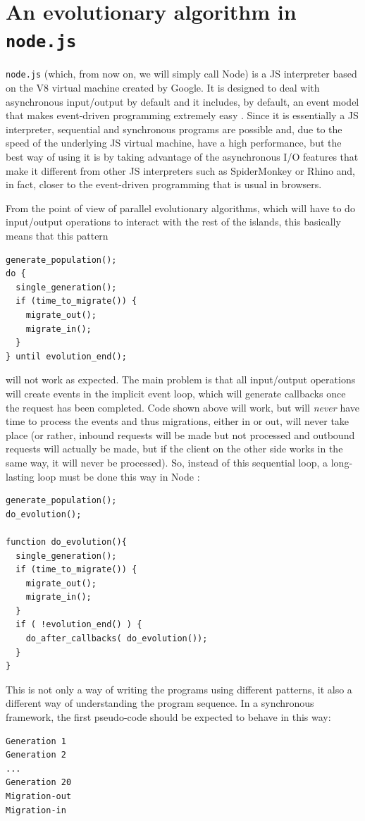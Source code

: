 \documentclass{sig-alternate}
\begin{document}
\section{An evolutionary algorithm in {\tt node.js}}
\label{sec:node}

{\tt node.js} (which, from now on, we will simply call Node) is a JS
interpreter based on the V8 virtual machine created by Google. It is
designed to deal with asynchronous input/output by default and it
includes, by default, an event model that makes event-driven
programming extremely easy \cite{5617064}. Since it is essentially a
JS interpreter, sequential and synchronous programs are possible and,
due to the speed of the underlying JS virtual machine, have a high
performance, but the best way of using it is by taking advantage of
the asynchronous I/O features that make it different from other JS
interpreters such as SpiderMonkey or Rhino and, in fact, closer to the
event-driven programming that is usual in browsers.

From the point of view of parallel evolutionary algorithms, which will
have to do input/output operations to interact with the rest of the
islands, this
basically means that this pattern
\begin{lstlisting}
generate_population();
do {
  single_generation();
  if (time_to_migrate()) {
    migrate_out();
    migrate_in();
  }
} until evolution_end();
\end{lstlisting}
will not work as expected. The main problem is that all input/output
operations will create events in the implicit event loop, which will
generate callbacks once the request has been completed. Code shown
above will work, but will {\em never} have time to process the events
and thus migrations, either in or out, will never take place (or
rather, inbound requests will be made but not processed and outbound
requests will actually be made, but if the client on the other side
works in the same way, it will never be processed). So, instead of
this sequential loop, a long-lasting loop must be done this way in
Node \cite{nodejs:patterns}:
\begin{lstlisting}
generate_population();
do_evolution();

function do_evolution(){
  single_generation();
  if (time_to_migrate()) {
    migrate_out();
    migrate_in();
  }
  if ( !evolution_end() ) {
    do_after_callbacks( do_evolution());
  }
}
\end{lstlisting}

This is not only a way of writing the programs using different patterns,
it also a different way of understanding the program sequence. In a
synchronous framework, the first pseudo-code should be expected to behave
in this way:
\begin{lstlisting}
Generation 1
Generation 2
...
Generation 20
Migration-out
Migration-in
\end{lstlisting}
\end{document}
